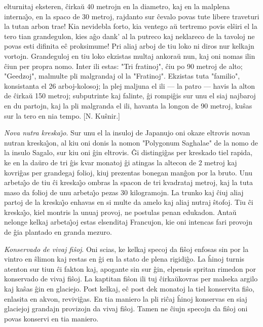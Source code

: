 elturnitaj eksteren, \^cirka\u u 40 metrojn en la diametro, kaj en
la malplena interna\^{\j}o, en la spaco de 30 metroj, rajdanto sur
\^cevalo povas tute libere traveturi la tutan arbon trae! Kia
nevidebla forto, kia ventego a\u u tertremo povis el\^siri el la
tero tian grandegulon, kies a\^go dank' al la putreco kaj neklareco
de la tavoloj ne povas esti difinita e\^c proksimume! Pri aliaj
arboj de tiu loko ni diros nur kelkajn vortojn. Grandeguloj en tiu
loko ekzistas multaj ankora\u u nun, kaj oni nomas ilin \^ciun per
propra nomo. Inter ili estas: "Tri fratinoj", \^ciu po 90 metroj
de alto; "Geedzoj", malmulte pli malgrandaj ol la "Fratinoj".
Ekzistas tuta "familio", konsistanta el 26 arboj-kolosoj; la plej
maljuna el ili --- la patro --- havis la alton de \^cirka\u u 150
metroj; subputrinte kaj falinte, \^gi rompi\^gis sur unu el siaj
najbaroj en du partojn, kaj la pli malgranda el ili, havanta la
longon de 90 metroj, ku\^sas sur la tero en nia tempo. [N.
Ku\^snir.]

\emph{Nova nutra kreska\^{\j}o}. Sur unu el la insuloj de Japanujo
oni okaze eltrovis novan nutran kreska\^{\j}on, al kiu oni donis la
nomon "Polygonum Saghalae" de la nomo de la insulo Sagalo, sur kiu
oni \^gin eltrovis. \^Gi distingi\^gas per kreskado tiel rapida, ke
en la da\u uro de tri \^gis kvar monatoj \^gi atingas la altecon de
2 metroj kaj kovri\^gas per grandegaj folioj, kiuj prezentas bonegan
man\^gon por la bruto. Unu arbeta\^{\j}o de tiu \^ci kreska\^{\j}o
ombras la spacon de tri kvadrataj metroj, kaj la tuta maso da folioj
de unu arbeta\^{\j}o pezas 30 kilogramojn. La trunko kaj \^ciuj
aliaj partoj de la kreska\^{\j}o enhavas en si multe da amelo kaj
aliaj nutraj \^stofoj. Tiu \^ci kreska\^{\j}o, kiel montris la unuaj
provoj, ne postulas penan edukadon. Anta\u u nelonge kelkaj
arbeta\^{\j}oj estas elsenditaj Francujon, kie oni intencas fari
provojn de \^gia plantado en granda mezuro.

\emph{Konservado de vivaj fi\^soj}. Oni scias, ke kelkaj specoj da
fi\^soj enfosas sin por la vintro en \^slimon kaj restas en \^gi en
la stato de plena rigidi\^go. La \^hinoj turnis atenton sur tiun
\^ci fakton kaj, apogante sin sur \^gin, elpensis spritan rimedon
por konservado de vivaj fi\^soj. La kaptitan fi\^son ili tuj
\^cirka\u ukovras per malseka argilo kaj ka\^sas \^gin en glaciejo.
Post kelkaj, e\^c post dek monatoj la tiel konservita fi\^so,
enlasita en akvon, revivi\^gas. En tia maniero la pli ri\^caj
\^hinoj konservas en siaj glaciejoj grandajn provizojn da vivaj
fi\^soj. Tamen ne \^ciujn specojn da fi\^soj oni povas konservi en
tia maniero.

